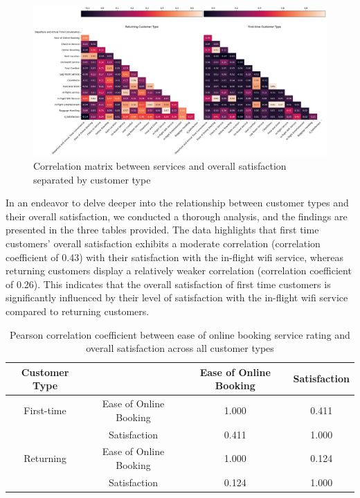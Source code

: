 \documentclass[11pt]{article}
\begin{document}
\begin{figure}[h]
\centering
\includegraphics[width=0.9\linewidth]{project_files/project_67_1.png}
\caption{\centering Correlation matrix between services and overall satisfaction separated by customer type}
\end{figure}

In an endeavor to delve deeper into the relationship between customer types and their overall satisfaction, we conducted a thorough analysis, and the findings are presented in the three tables provided. The data highlights that first time customers' overall satisfaction exhibits a moderate correlation (correlation coefficient of \num{0.43}) with their satisfaction with the in-flight wifi service, whereas returning customers display a relatively weaker correlation (correlation coefficient of \num{0.26}). This indicates that the overall satisfaction of first time customers is significantly influenced by their level of satisfaction with the in-flight wifi service compared to returning customers.

\begin{table}[!h]
    \centering
    \begin{tabular}{|c|c|c|c|}
        \hline
        Customer Type             &                         & Ease of Online Booking & Satisfaction \\
        \hline
        First-time  &  Ease of Online Booking       &         1.000    &    0.411 \\
        \hline
              & Satisfaction               &         0.411    &    1.000 \\
        \hline
        \hline
        Returning   &  Ease of Online Booking       &         1.000    &    0.124 \\
        \hline
              & Satisfaction               &         0.124    &    1.000 \\
        \hline
    \end{tabular}
    \caption{\centering Pearson correlation coefficient between ease of online booking service rating and overall satisfaction across all customer types}
    \label{tab:7-3-2}
\end{table}
\end{document}

